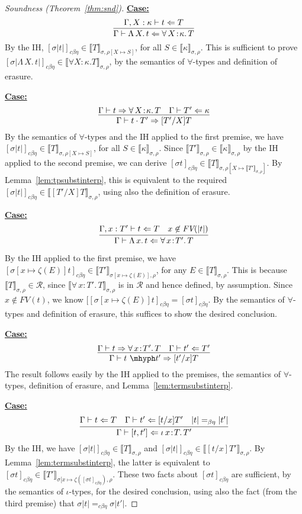\documentclass{article}
\newcommand{\choice}[0]{\zeta}
\newcommand{\abs}[4]{{#1}\, #2\! : \! #3.\, #4}
\newcommand{\absu}[3]{{#1}\, #2.\, #3}
\newcommand{\interp}[1]{\llbracket #1 \rrbracket}
\newcommand{\tpcheck}[0]{\Leftarrow}
\newcommand{\tpsynth}[0]{\Rightarrow}
\newcommand{\cbe}[0]{c\beta\eta}
\newcommand{\startcase}[1]{\vspace{#1} \noindent\textbf{\underline{Case:}}}
\begin{document}
\begin{proof}[Soundness (Theorem~\ref{thm:snd})]
\startcase{.2cm}
\[
    \infer{\Gamma\vdash \absu{\Lambda}{X}{t} \tpcheck \abs{\forall}{X}{\kappa}{T}}{\Gamma,X:\kappa\vdash t \tpcheck T} 
\]
By the IH, $[\sigma |t|]_{\cbe}\in\interp{T}_{\sigma,\rho[X\mapsto S]}$, for all $S\in\interp{\kappa}_{\sigma,\rho}$.
This is sufficient to prove $[\sigma |\absu{\Lambda}{X}{t}|]_{\cbe}\in\interp{\forall X:\kappa.T}_{\sigma,\rho}$, by the semantics
of $\forall$-types and definition of erasure.

\startcase{.2cm}
\[
    \infer{\Gamma\vdash t \cdot T' \tpsynth [T'/X]T}
          {\Gamma\vdash t \tpsynth \abs{\forall}{X}{\kappa}{T} & \Gamma\vdash T' \tpcheck\kappa} 
\]
By the semantics of $\forall$-types and the IH applied to the first
premise, we have $[\sigma |t|]_{\cbe}\in\interp{T}_{\sigma,\rho[X\mapsto
  S]}$, for all $S\in\interp{\kappa}_{\sigma,\rho}$.  Since
$\interp{T'}_{\sigma,\rho}\in\interp{\kappa}_{\sigma,\rho}$ by the IH
applied to the second premise, we can derive $[\sigma t]_{\cbe}\in\interp{T}_{\sigma,\rho[X\mapsto \interp{T'}_{\sigma,\rho}]}$.
By Lemma~\ref{lem:tpsubstinterp},
this is equivalent to the required $[\sigma |t|]_{\cbe}\in\interp{[T'/X]T}_{\sigma,\rho}$,
using also the definition of erasure.

\startcase{.2cm}
\[
    \infer{\Gamma\vdash \absu{\Lambda}{x}{t} \tpcheck \abs{\forall}{x}{T'}{T}}{\Gamma,x:T'\vdash t \tpcheck T & x\not\in\textit{FV}(|t|)} 
\]

By the IH applied to the first premise, we have
$[\sigma[x\mapsto\choice(E)]
t]_{\cbe}\in\interp{T'}_{\sigma[x\mapsto\choice(E)],\rho}$, for any
$E\in\interp{T}_{\sigma,\rho}$.  This is because
$\interp{T}_{\sigma,\rho}\in\mathcal{R}$, since $\interp{\abs{\forall}{x}{T'}{T}}_{\sigma,\rho}$ is in $\mathcal{R}$ and
hence defined, by assumption.  Since $x\not\in\textit{FV}(t)$, we know
$[[\sigma[x\mapsto\choice(E)]t]_{\cbe} = [\sigma t]_{\cbe}$.  By the
semantics of $\forall$-types and definition of erasure, this suffices to show the desired
conclusion.

\startcase{.2cm}
\[
    \infer{\Gamma\vdash t\ \mhyph t' \tpsynth [t'/x]T}{\Gamma\vdash t \tpsynth \abs{\forall}{x}{T'}{T} & \Gamma\vdash t' \tpcheck T'}
\]
The result follows easily by the IH applied to the premises, the
semantics of $\forall$-types, definition of erasure, and Lemma~\ref{lem:termsubstinterp}.


\startcase{.2cm}
\[
    \infer{\Gamma\vdash [ t , t' ] \tpcheck \abs{\iota}{x}{T}{T'}}
          {\Gamma\vdash t \tpcheck T & \Gamma\vdash t' \tpcheck [t/x]T' & |t| =_{\beta\eta} |t'|} 
\]
By the IH, we have $[\sigma |t|]_{\cbe}\in\interp{T}_{\sigma,\rho}$ and
$[\sigma |t|]_{\cbe}\in\interp{[t/x]T'}_{\sigma,\rho}$.  By
Lemma~\ref{lem:termsubstinterp}, the latter is equivalent to
$[\sigma t]_{\cbe}\in\interp{T'}_{\sigma[x\mapsto\choice([\sigma t]_{\cbe}),\rho}$.  These two facts about $[\sigma t]_{\cbe}$ are
sufficient, by the semantics of $\iota$-types, for the desired
conclusion, using also the fact (from the third premise) that $\sigma|t| =_{\cbe} \sigma|t'|$.


\end{proof}
\end{document}
